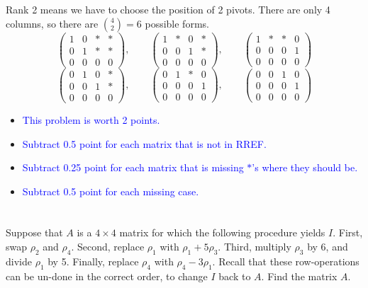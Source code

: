 \documentclass[10pt,twoside]{article}
\begin{document}
Rank 2 means we have to choose the position of 2 pivots.  There are only 4
columns, so there are $\binom{4}{2} = 6$ possible forms.
\[
\begin{pmatrix}
1 & 0 & * & *\\
0 & 1 & * & *\\
0 & 0 & 0 & 0
\end{pmatrix},\qquad
\begin{pmatrix}
1 & * & 0 & *\\
0 & 0 & 1 & *\\
0 & 0 & 0 & 0
\end{pmatrix},\qquad
\begin{pmatrix}
1 & * & * & 0\\
0 & 0 & 0 & 1\\
0 & 0 & 0 & 0
\end{pmatrix}\]
\[
\begin{pmatrix}
0 & 1 & 0 & *\\
0 & 0 & 1 & *\\
0 & 0 & 0 & 0
\end{pmatrix},\qquad
\begin{pmatrix}
0 & 1 & * & 0\\
0 & 0 & 0 & 1\\
0 & 0 & 0 & 0
\end{pmatrix},\qquad
\begin{pmatrix}
0 & 0 & 1 & 0\\
0 & 0 & 0 & 1\\
0 & 0 & 0 & 0
\end{pmatrix}\]

\begin{itemize}
\item\textcolor{blue}{This problem is worth 2 points.}
\item\textcolor{blue}{Subtract 0.5 point for each matrix that is not in
RREF.}
\item\textcolor{blue}{Subtract 0.25 point for each matrix that is missing
$\ast$'s where they should be.}
\item\textcolor{blue}{Subtract 0.5 point for each missing case.}
\end{itemize}


\section{ }
{\color{red}Suppose that $A$ is a $4 \times 4$ matrix for which the following procedure
yields $I$.  First, swap $\rho_2$ and $\rho_4$.  Second, replace
$\rho_1$ with $\rho_1 + 5\rho_3$.  Third, multiply $\rho_3$ by 6, and divide
$\rho_1$ by 5.  Finally, replace $\rho_4$ with $\rho_4 - 3 \rho_1$.
Recall that these row-operations can be un-done in the correct order, to change $I$ back to $A$.
Find the matrix $A$.
}
\end{document}
